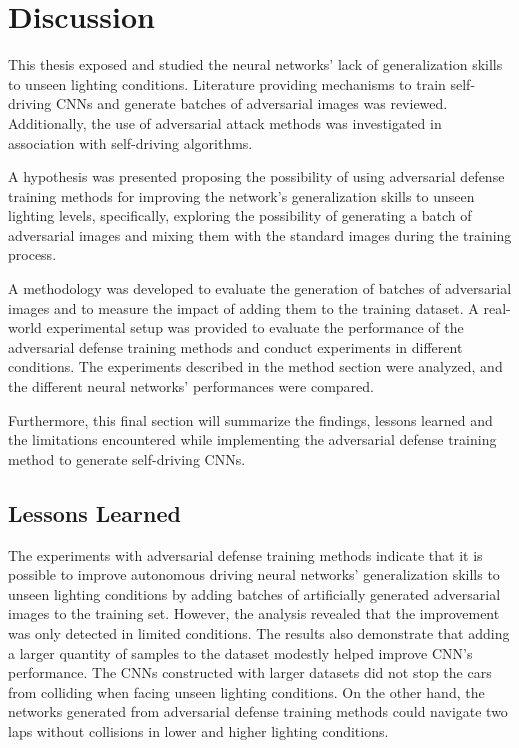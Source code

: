 \documentclass[12pt]{article}
\begin{document}
\clearpage
\section{Discussion}

This thesis exposed and studied the neural networks' lack of generalization skills to unseen lighting conditions. Literature providing mechanisms to train self-driving CNNs and generate batches of adversarial images was reviewed. Additionally, the use of adversarial attack methods was investigated in association with self-driving algorithms. 

A hypothesis was presented proposing the possibility of using adversarial defense training methods for improving the network's generalization skills to unseen lighting levels, specifically, exploring the possibility of generating a batch of adversarial images and mixing them with the standard images during the training process.

A methodology was developed to evaluate the generation of batches of adversarial images and to measure the impact of adding them to the training dataset. A real-world experimental setup was provided to evaluate the performance of the adversarial defense training methods and conduct experiments in different conditions. The experiments described in the method section were analyzed, and the different neural networks' performances were compared.

Furthermore, this final section will summarize the findings, lessons learned and the limitations encountered while implementing the adversarial defense training method to generate self-driving CNNs.

\subsection{Lessons Learned}

The experiments with adversarial defense training methods indicate that it is possible to improve autonomous driving neural networks' generalization skills to unseen lighting conditions by adding batches of artificially generated adversarial images to the training set. However, the analysis revealed that the improvement was only detected in limited conditions. The results also demonstrate that adding a larger quantity of samples to the dataset modestly helped improve CNN's performance. The CNNs constructed with larger datasets did not stop the cars from colliding when facing unseen lighting conditions. On the other hand, the networks generated from adversarial defense training methods could navigate two laps without collisions in lower and higher lighting conditions. 
\end{document}
